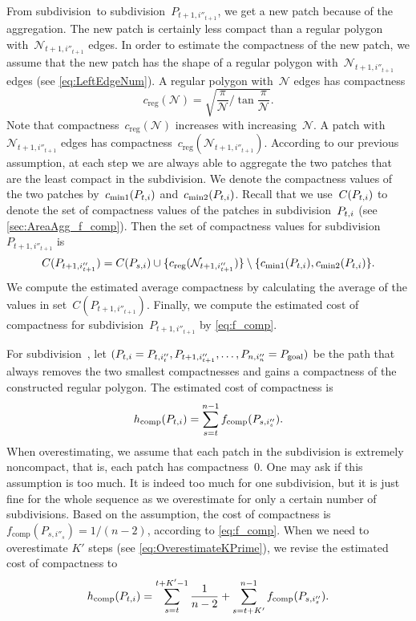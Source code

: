 \documentclass[acmsmall,natbib=false]{acmart}
\begin{document}
From subdivision~\Pnode to subdivision~$P_{t+1,i''_{t+1}}$,
we get a new patch because of the aggregation.
The new patch is certainly less compact than a regular polygon 
with~$\mathcal{N}_{t+1,i''_{t+1}}$ edges.
In order to estimate the compactness of the new patch, 
we assume that 
the new patch has the shape of a regular polygon 
with~$\mathcal{N}_{t+1,i''_{t+1}}$ edges 
(see \eq\ref{eq:LeftEdgeNum}).
A regular polygon with~$\mathcal{N}$ edges has compactness
\begin{equation*}
\label{eq:comp_regular}
c_\mathrm{reg}(\mathcal{N})=
\sqrt{\frac{\pi}{\mathcal{N}} \bigg/
	\tan{\frac{\pi}{\mathcal{N}}}}.
\end{equation*}
Note that compactness~$c_\mathrm{reg}(\mathcal{N})$ increases 
with increasing~$\mathcal{N}$.
A patch with~$\mathcal{N}_{t+1,i''_{t+1}}$ edges has
compactness~$c_\mathrm{reg} (\mathcal{N}_{t+1,i''_{t+1}})$.
According to our previous assumption, 
at each step we are always able to aggregate the two patches 
that are the least compact in the subdivision.
We denote the compactness values of the two patches
by~$c_\mathrm{min1}(P_{t,i})$ and~$c_\mathrm{min2}(P_{t,i})$.
Recall that we use~$C(P_{t,i})$ to denote 
the set of compactness values of the patches
in subdivision~$P_{t,i}$ 
(see \sect\ref{sec:AreaAgg_f_comp}).
Then the set of compactness values 
for subdivision~$P_{t+1,i''_{t+1}}$ is 
\begin{equation}
\label{eq:compsetnew}
C(P_{t+1,i''_{t+1}})=
C(P_{s,i})\cup 
\{c_\mathrm{reg} (\mathcal{N}_{t+1,i''_{t+1}})\}
\setminus \{c_\mathrm{min1}(P_{t,i}), c_\mathrm{min2}(P_{t,i})\}.
\nonumber
\end{equation}
We compute the estimated average compactness 
by calculating the average 
of the values in set~$C(P_{t+1,i''_{t+1}})$.
Finally, we compute the estimated cost of compactness 
for subdivision~$P_{t+1,i''_{t+1}}$ by \eq\ref{eq:f_comp}.

For subdivision~\Pnode, let
$(P_{t,i}=P_{t,i''_t}, P_{t+1,i''_{t+1}}, 
\dots,P_{n,i''_n}=P_\mathrm{goal})$
be the path that always removes the two smallest compactnesses
and gains a compactness of the constructed regular polygon.
The estimated cost of compactness is
\begin{equation}
\label{eq:h_comp}
h_\mathrm{comp}(P_{t,i})=
\sum_{s=t}^{n-1}f_\mathrm{comp}(P_{s,i''_s}).
\end{equation}
When overestimating, we assume that 
each patch in the subdivision is extremely noncompact,
that is, each patch has compactness~$0$.
One may ask if this assumption is too much.
It is indeed too much for one subdivision, 
but it is just fine for the whole sequence
as we overestimate for only a certain number of subdivisions.
Based on the assumption, the cost of compactness 
is~$f_\mathrm{comp}(P_{s,i''_s})=1/(n-2)$,
according to \eq\ref{eq:f_comp}.
When we need to overestimate $K'$ steps
(see \eq\ref{eq:OverestimateKPrime}), 
we revise the estimated cost of compactness to
\begin{equation}
\label{eq:o_comp}
h_\mathrm{comp}(P_{t,i})=
\sum_{s=t}^{t+K'-1}\frac{1}{n-2}+
\sum_{s=t+K'}^{n-1}f_\mathrm{comp}(P_{s,i''_s}).
\end{equation}
\end{document}
